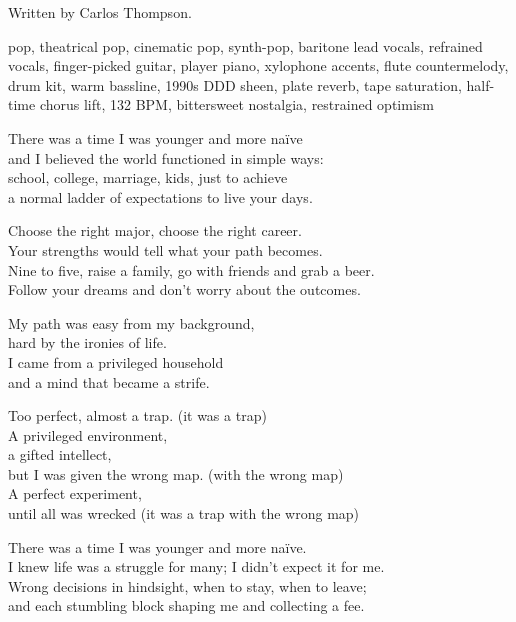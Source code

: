 
\begin{notes}
Written by Carlos Thompson.
\end{notes}
\begin{style}
pop, theatrical pop, cinematic pop, synth-pop, baritone lead vocals, refrained vocals, finger-picked guitar, player piano, xylophone accents, flute countermelody, drum kit, warm bassline, 1990s DDD sheen, plate reverb, tape saturation, half-time chorus lift, 132 BPM, bittersweet nostalgia, restrained optimism
\end{style}
\begin{lyrics}
There was a time I was younger and more naïve\\
and I believed the world functioned in simple ways:\\
school, college, marriage, kids, just to achieve\\
a normal ladder of expectations to live your days.

Choose the right major, choose the right career.\\
Your strengths would tell what your path becomes.\\
Nine to five, raise a family, go with friends and grab a beer.\\
Follow your dreams and don't worry about the outcomes.

My path was easy from my background,\\
hard by the ironies of life.\\
I came from a privileged household\\
and a mind that became a strife.

Too perfect, almost a trap. (it was a trap)\\
A privileged environment,\\
a gifted intellect,\\
but I was given the wrong map. (with the wrong map)\\
A perfect experiment,\\
until all was wrecked
(it was a trap with the wrong map)

There was a time I was younger and more naïve.\\
I knew life was a struggle for many; I didn't expect it for me.\\
Wrong decisions in hindsight, when to stay, when to leave;\\
and each stumbling block shaping me and collecting a fee.


\end{lyrics}

